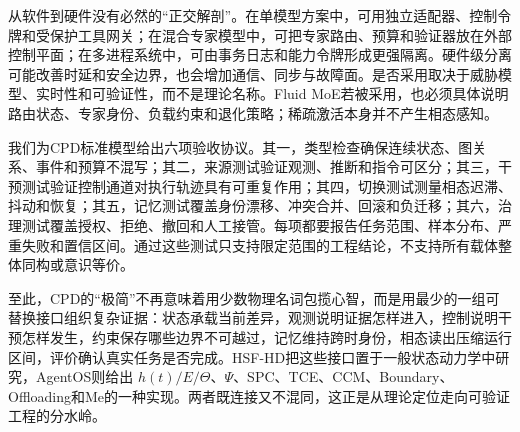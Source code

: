 从软件到硬件没有必然的“正交解剖”。在单模型方案中，可用独立适配器、控制令牌和受保护工具网关；在混合专家模型中，可把专家路由、预算和验证器放在外部控制平面；在多进程系统中，可由事务日志和能力令牌形成更强隔离。硬件级分离可能改善时延和安全边界，也会增加通信、同步与故障面。是否采用取决于威胁模型、实时性和可验证性，而不是理论名称。Fluid MoE若被采用，也必须具体说明路由状态、专家身份、负载约束和退化策略；稀疏激活本身并不产生相态感知。

我们为CPD标准模型给出六项验收协议。其一，类型检查确保连续状态、图关系、事件和预算不混写；其二，来源测试验证观测、推断和指令可区分；其三，干预测试验证控制通道对执行轨迹具有可重复作用；其四，切换测试测量相态迟滞、抖动和恢复；其五，记忆测试覆盖身份漂移、冲突合并、回滚和负迁移；其六，治理测试覆盖授权、拒绝、撤回和人工接管。每项都要报告任务范围、样本分布、严重失败和置信区间。通过这些测试只支持限定范围的工程结论，不支持所有载体整体同构或意识等价。

至此，CPD的“极简”不再意味着用少数物理名词包揽心智，而是用最少的一组可替换接口组织复杂证据：状态承载当前差异，观测说明证据怎样进入，控制说明干预怎样发生，约束保存哪些边界不可越过，记忆维持跨时身份，相态读出压缩运行区间，评价确认真实任务是否完成。HSF-HD把这些接口置于一般状态动力学中研究，AgentOS则给出 $h(t)/E/\Theta$、$\Psi$、SPC、TCE、CCM、Boundary、Offloading和Me的一种实现。两者既连接又不混同，这正是从理论定位走向可验证工程的分水岭。

